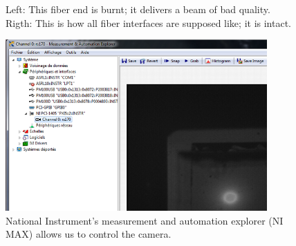 \begin{figure}
\centering
{}
\caption{Left: This fiber end is burnt; it delivers a beam of bad quality.
Rigth: This is how all fiber interfaces are supposed like; it is intact.}
\label{img:burnt}
\end{figure}

\begin{figure}
\centering
\includegraphics[width=10cm]{img/ni-max.png}
\caption{National Instrument's measurement and automation explorer
(NI MAX) allows us to control the camera.}
\label{img:ni_max}
\end{figure}



